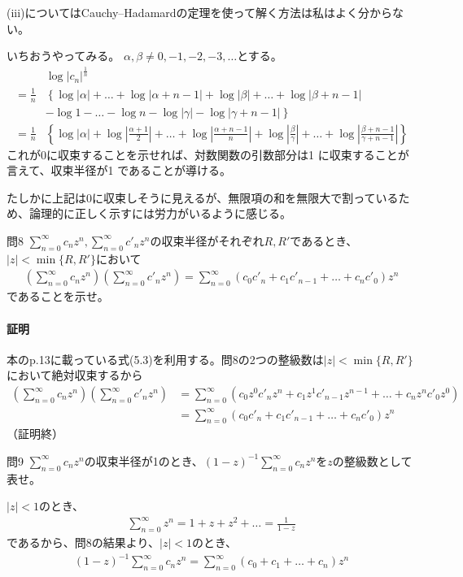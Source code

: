 (iii)についてはCauchy--Hadamardの定理を使って解く方法は私はよく分からない。

いちおうやってみる。
$\alpha, \beta\neq 0, -1,-2,-3,\dots$とする。
\begin{align*}
    &\log |c_n|^\frac{1}{n}\\
   =\frac{1}{n}
   &\left\{ 
   \log|\alpha|+\dots+\log|\alpha+n-1|
   +\log|\beta|+\dots+\log|\beta+n-1|\right.\\
   &\left.
   -\log 1-\dots-\log n 
   -\log|\gamma|-\log|\gamma+n-1| 
   \right\}\\
   =\frac{1}{n}&\left\{ \log|\alpha|+\log\left|\frac{\alpha+1}{2}\right|+\dots+\log\left|\frac{\alpha+n-1}{n}\right|
   +\log\left|\frac{\beta}{\gamma}\right|
   +\dots+\log\left|\frac{\beta+n-1}{\gamma+n-1}\right|\right\}
\end{align*}
これが0に収束することを示せれば、対数関数の引数部分は1
に収束することが言えて、収束半径が1
であることが導ける。

たしかに上記は0に収束しそうに見えるが、無限項の和を無限大で割っているため、論理的に正しく示すには労力がいるように感じる。
\begin{mysimplebox}{問8}
    $\displaystyle\sum_{n=0}^{\infty}c_nz^n, \sum_{n=0}^{\infty}c'_nz^n$の収束半径がそれぞれ$R, R'$であるとき、$|z|<\min\{R, R'\}$において
    \begin{align*}
        \left(\sum_{n=0}^{\infty}c_nz^n\right)\left(\sum_{n=0}^{\infty}c'_nz^n\right)
        =\sum_{n=0}^{\infty}(c_0c'_n+c_1c'_{n-1}+\dots+c_nc'_0)z^n
    \end{align*}
    であることを示せ。
\end{mysimplebox}
\paragraph{証明}
本のp.13に載っている式(5.3)を利用する。問8の2つの整級数は$|z|<\min\{R, R'\}$において絶対収束するから
\begin{align*}
    \left(\sum_{n=0}^{\infty}c_nz^n\right)\left(\sum_{n=0}^{\infty}c'_nz^n\right)
    &=\sum_{n=0}^{\infty}(c_0z^0c'_nz^n+c_1z^1c'_{n-1}z^{n-1}+\dots+c_nz^nc'_0z^0)\\
    &=\sum_{n=0}^{\infty}(c_0c'_n+c_1c'_{n-1}+\dots+c_nc'_0)z^n
\end{align*}
（証明終）

\begin{mysimplebox}{問9}
    $\displaystyle\sum_{n=0}^{\infty}c_nz^n$の収束半径が1のとき、$\displaystyle(1-z)^{-1}\sum_{n=0}^{\infty}c_nz^n$を$z$の整級数として表せ。
\end{mysimplebox}
$|z|<1$のとき、
\begin{align*}
    \sum_{n=0}^{\infty}z^n=1+z+z^2+\dots=\frac{1}{1-z}
\end{align*}
であるから、問8の結果より、$|z|<1$のとき、
\begin{align*}
    (1-z)^{-1}\sum_{n=0}^{\infty}c_nz^n=\sum_{n=0}^{\infty}(c_0+c_1+\dots+c_n)z^n
\end{align*}

